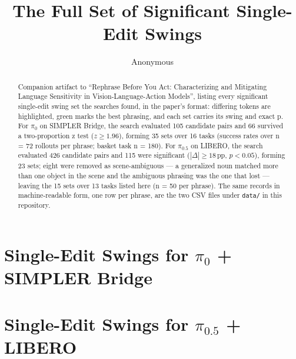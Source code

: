 \documentclass[letterpaper, 10 pt, conference]{ieeeconf}
\title{\LARGE \bf
The Full Set of Significant Single-Edit Swings
}
\author{Anonymous}
\begin{document}
\maketitle
\thispagestyle{empty}
\pagestyle{empty}

\begin{abstract}
Companion artifact to ``Rephrase Before You Act: Characterizing and
Mitigating Language Sensitivity in Vision-Language-Action Models'',
listing every significant single-edit swing set the searches found, in
the paper's format: differing tokens are highlighted, green marks the
best phrasing, and each set carries its swing and exact p. For $\pi_0$ on
SIMPLER Bridge, the search evaluated 105 candidate pairs and 66 survived
a two-proportion z test ($z \ge 1.96$), forming 35 sets over 16 tasks
(success rates over n = 72 rollouts per phrase; basket task n = 180). For
$\pi_{0.5}$ on LIBERO, the search evaluated 426 candidate pairs and 115
were significant ($|\Delta| \ge 18$\,pp, $p < 0.05$), forming 23 sets;
eight were removed as scene-ambiguous --- a generalized noun matched more
than one object in the scene and the ambiguous phrasing was the one that
lost --- leaving the 15 sets over 13 tasks listed here (n = 50 per
phrase). The same records in machine-readable
form, one row per phrase, are the two CSV files under \texttt{data/} in
this repository.
\end{abstract}

\section{Single-Edit Swings for $\pi_0$ + SIMPLER Bridge}

{\scriptsize\raggedright\setlength{\fboxsep}{1.1pt}\setlength{\parindent}{0pt}\setlength{\parskip}{0pt}%
\par}

\section{Single-Edit Swings for $\pi_{0.5}$ + LIBERO}

{\scriptsize\raggedright\setlength{\fboxsep}{1.1pt}\setlength{\parindent}{0pt}\setlength{\parskip}{0pt}%
\par}
\end{document}
